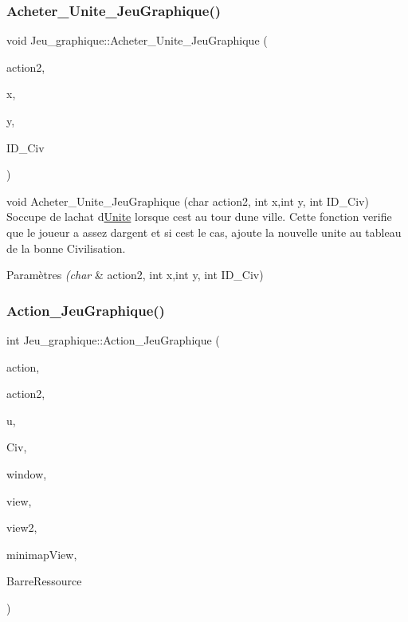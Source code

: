 \subsubsection{\texorpdfstring{Acheter\+\_\+\+Unite\+\_\+\+Jeu\+Graphique()}{Acheter\_Unite\_JeuGraphique()}}
{\footnotesize\ttfamily void Jeu\+\_\+graphique\+::\+Acheter\+\_\+\+Unite\+\_\+\+Jeu\+Graphique (\begin{DoxyParamCaption}\item[{char}]{action2,  }\item[{int}]{x,  }\item[{int}]{y,  }\item[{int}]{I\+D\+\_\+\+Civ }\end{DoxyParamCaption})}



void Acheter\+\_\+\+Unite\+\_\+\+Jeu\+Graphique (char action2, int x,int y, int I\+D\+\_\+\+Civ) S\textquotesingle{}occupe de l\textquotesingle{}achat d\textquotesingle{}\hyperlink{classUnite}{Unite} lorsque c\textquotesingle{}est au tour d\textquotesingle{}une ville. Cette fonction verifie que le joueur a assez d\textquotesingle{}argent et si c\textquotesingle{}est le cas, ajoute la nouvelle unite au tableau de la bonne Civilisation. 


\begin{DoxyParams}{Paramètres}
{\em (char} & action2, int x,int y, int I\+D\+\_\+\+Civ) \\
\hline
\end{DoxyParams}
\mbox{\label{classJeu__graphique_a259e8ddfadc2d86563c52fde722e9de9}} 
\subsubsection{\texorpdfstring{Action\+\_\+\+Jeu\+Graphique()}{Action\_JeuGraphique()}}
{\footnotesize\ttfamily int Jeu\+\_\+graphique\+::\+Action\+\_\+\+Jeu\+Graphique (\begin{DoxyParamCaption}\item[{char}]{action,  }\item[{char}]{action2,  }\item[{\hyperlink{classUnite}{Unite} $\ast$}]{u,  }\item[{\hyperlink{classCivilization}{Civilization} \&}]{Civ,  }\item[{sf\+::\+Render\+Window \&}]{window,  }\item[{sf\+::\+View \&}]{view,  }\item[{sf\+::\+View \&}]{view2,  }\item[{sf\+::\+View \&}]{minimap\+View,  }\item[{sf\+::\+View \&}]{Barre\+Ressource }\end{DoxyParamCaption})}



